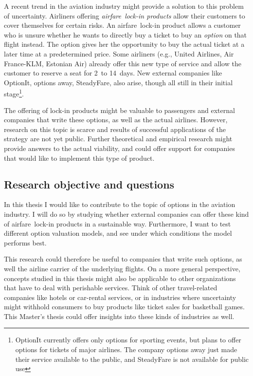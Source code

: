 A recent trend in the aviation industry might provide a solution to this problem of uncertainty. Airliners offering \emph{airfare~lock-in products} allow their customers to cover themselves for certain risks. An airfare~lock-in product allows a customer who is unsure whether he wants to directly buy a ticket to buy an \emph{option} on that flight instead. The option gives her the opportunity to buy the actual ticket at a later time at a predetermined price. Some airliners (e.g., United Airlines, Air France-KLM, Estonian Air) already offer this new type of service and allow the customer to reserve a seat for 2~to 14~days. New external companies like OptionIt, options away, SteadyFare, also arise, though all still in their initial stage\footnote{OptionIt currently offers only options for sporting events, but plans to offer options for tickets of major airlines. The company options away just made their service available to the public, and SteadyFare is not available for public use}.

The offering of lock-in products might be valuable to passengers and external companies that write these options, as well as the actual airlines. However, research on this topic is scarce and results of successful applications of the strategy are not yet public. Further theoretical and empirical research might provide answers to the actual viability, and could offer support for companies that would like to implement this type of product.

\subsection{Research objective and questions}
In this thesis I would like to contribute to the topic of options in the aviation industry. I will do so by studying whether external companies can offer these kind of airfare~lock-in products in a sustainable way. Furthermore, I want to test different option valuation models, and see under which conditions the model performs best.

This research could therefore be useful to companies that write such options, as well the airline carrier of the underlying flights. On a more general perspective, concepts studied in this thesis might also be applicable to other organizations that have to deal with perishable services. Think of other travel-related companies like hotels or car-rental services, or in industries where uncertainty might withhold consumers to buy products like ticket sales for basketball games. This Master's thesis could offer insights into these kinds of industries as well.

